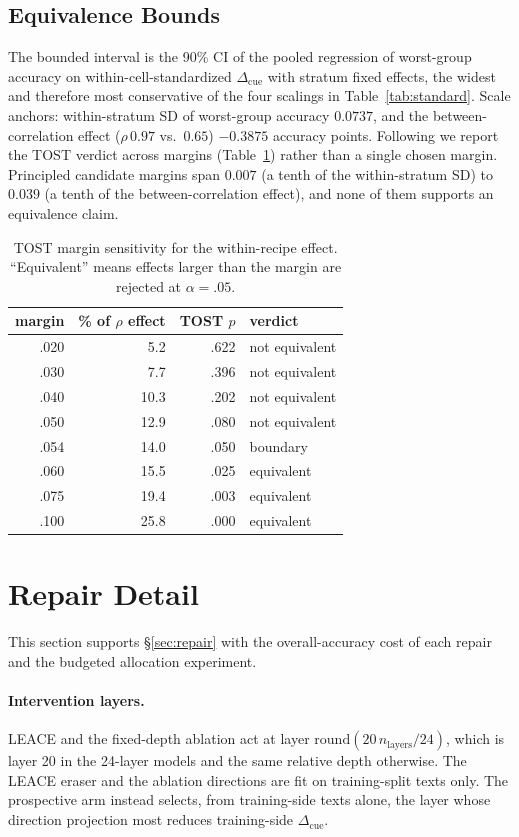 \documentclass[11pt]{article}
\newcommand{\cued}{\ensuremath{\Delta_{\mathrm{cue}}}}
\begin{document}
\subsection{Equivalence Bounds}
\label{app:tost}
The bounded interval is the 90\% CI of the pooled regression of worst-group
accuracy on within-cell-standardized \cued{} with stratum fixed effects, the
widest and therefore most conservative of the four scalings in
Table~\ref{tab:standard}. Scale anchors: within-stratum SD of worst-group
accuracy $0.0737$, and the between-correlation effect ($\rho\,0.97$ vs.\ $0.65$)
$-0.3875$ accuracy points.
Following \citet{braun2022equivalence} we report the TOST verdict across
margins (Table~\ref{tab:tost}) rather than a single chosen margin. Principled
candidate margins span $0.007$ (a tenth of the within-stratum SD) to $0.039$
(a tenth of the between-correlation effect), and none of them supports an equivalence
claim.

\begin{table}[t]
\centering\small
\begin{tabular}{rrrl}
\toprule
margin & \% of $\rho$ effect & TOST $p$ & verdict \\
\midrule
.020 &  5.2 & .622 & not equivalent \\
.030 &  7.7 & .396 & not equivalent \\
.040 & 10.3 & .202 & not equivalent \\
.050 & 12.9 & .080 & not equivalent \\
.054 & 14.0 & .050 & boundary \\
.060 & 15.5 & .025 & equivalent \\
.075 & 19.4 & .003 & equivalent \\
.100 & 25.8 & .000 & equivalent \\
\bottomrule
\end{tabular}
\caption{TOST margin sensitivity for the within-recipe effect. ``Equivalent''
means effects larger than the margin are rejected at $\alpha{=}.05$.}
\label{tab:tost}
\end{table}

\section{Repair Detail}
\label{app:repairdetail}
This section supports \S\ref{sec:repair} with the overall-accuracy cost of
each repair and the budgeted allocation experiment.

\paragraph{Intervention layers.}
LEACE and the fixed-depth ablation act at layer
$\mathrm{round}(20\,n_{\text{layers}}/24)$, which is layer 20 in the 24-layer
models and the same relative depth otherwise. The LEACE eraser and the
ablation directions are fit on training-split texts only. The prospective arm
instead selects, from training-side texts alone, the layer whose direction
projection most reduces training-side \cued{}.
\end{document}
